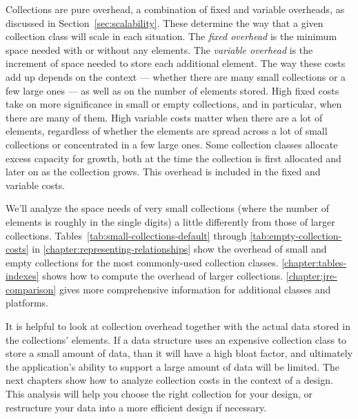 Collections are pure overhead, a combination of fixed and
variable overheads, as discussed in Section~\ref{sec:scalability}. These
determine the way that a given collection class will scale in
each situation. The \emph{fixed overhead} is the minimum space needed
with or without any elements. The \emph{variable overhead} is the increment of
space needed to store each additional element. The way these costs add up
depends on the context --- whether there are many small collections or a few large ones --- as well as
on the number of elements stored. High fixed costs take on more significance in
small or empty collections, and in particular, when there are many of them.
High variable costs matter when there are a lot of elements, regardless of whether
the elements are spread across a lot of small collections or concentrated in a
few large ones. Some collection classes allocate excess capacity for growth,
both at the time the collection is first allocated and later on as the
collection grows. This overhead is included in the fixed and variable costs.  

We'll analyze the space needs of very small
collections (where the number of elements is roughly in the single digits) a
little differently from those of larger collections.
Tables~\ref{tab:small-collections-default} through \ref{tab:empty-collection-costs} in
\autoref{chapter:representing-relationships} show the overhead of small and empty collections for
the most commonly-used collection classes. \autoref{chapter:tables-indexes}
shows how to compute the overhead of larger collections.
\autoref{chapter:jre-comparison} gives more comprehensive information for
additional classes and platforms.


It is helpful to look at collection overhead 
together with the actual data stored in the collections' elements.
If a data structure uses an expensive collection class to store a small amount of data, than it
will have a high bloat factor, and ultimately the application's ability to
support a large amount of data will be limited. The next chapters show
how to analyze collection costs in the context of a design.
This analysis will help you choose the right collection for your design, or
restructure your data into a more efficient design if necessary.

